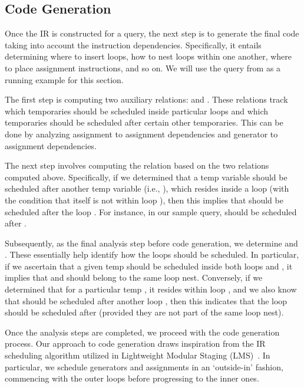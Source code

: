 \documentclass[runningheads]{llncs}
\begin{document}
\vspace{-2mm}
\subsection{Code Generation}
\vspace{-2mm}
Once the IR is constructed for a query, the next step is to generate the final code
taking into account the instruction dependencies.
Specifically, it entails determining where to insert loops, how to nest loops
within one another, where to place assignment instructions, and so on. 
We will use the query from  as a running example for this
section.

The first step is computing two auxiliary relations:
 and .
These relations track which temporaries should be scheduled
inside particular loops and which temporaries should be scheduled after
certain other temporaries.
This can be done by analyzing assignment to assignment dependencies and
generator to assignment dependencies.

The next step involves computing the relation  based on the two
relations computed above.
Specifically, if we determined that a temp variable  should be scheduled after
another temp variable  (i.e., ), which resides inside a loop 
(with the condition that  itself is not within loop ),
then this implies that  should be scheduled after the loop .
For instance, in our sample query,  should be scheduled after .

Subsequently, as the final analysis step before code generation, we determine
 and .
These essentially help identify how the loops should be scheduled.
In particular, if we ascertain that a given temp  should be scheduled
inside both loops  and , it implies that  and
 should belong to the same loop nest.
Conversely, if we determined that for a particular temp ,
it resides within loop , and we also know that  should be
scheduled after another loop , then this indicates that the loop 
should be scheduled after  (provided they are not part of the same loop nest).

Once the analysis steps are completed, we proceed with the code
generation process.
Our approach to code generation draws inspiration from the IR scheduling
algorithm utilized in Lightweight Modular Staging (LMS)~\cite{lms}.
In particular, we schedule generators and assignments in an
`outside-in' fashion, commencing with the outer loops before
progressing to the inner ones.
\end{document}
